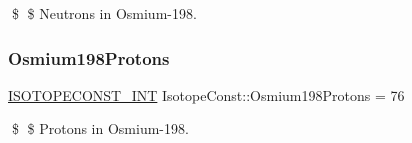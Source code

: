 \$ \$ Neutrons in Osmium-\/198. \mbox{\label{group___isotope_const-_osmium-_os198_ga715038c6149288207ee77aed2ed1f8f5}} 
\subsubsection{\texorpdfstring{Osmium198\+Protons}{Osmium198Protons}}
{\footnotesize\ttfamily \mbox{\hyperlink{group___isotope_const-_macros_ga5f18360b3e99483a35c32d789e62621c}{I\+S\+O\+T\+O\+P\+E\+C\+O\+N\+S\+T\+\_\+\+I\+NT}} Isotope\+Const\+::\+Osmium198\+Protons = 76}

\$ \$ Protons in Osmium-\/198. 